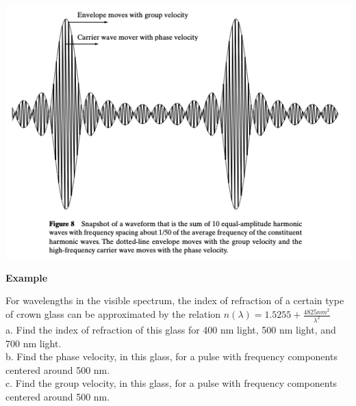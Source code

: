 \documentclass[10pt]{article}
\begin{document}
\begin{center}
    \includegraphics*[scale = .5]{imgs/envolope-example.png}
\end{center}

\newpage

\textbf{Example}

For wavelengths in the visible spectrum, the index of refraction of a certain type of crown glass can be approximated by the relation $n(\lambda) = 1.5255 + \frac{4825nm^2}{\lambda^2}$ \\
a. Find the index of refraction of this glass for 400 nm light, 500 nm light,
and 700 nm light. \\
b. Find the phase velocity, in this glass, for a pulse with frequency components centered around 500 nm. \\
c. Find the group velocity, in this glass, for a pulse with frequency components centered around 500 nm.

\newblock
\end{document}
